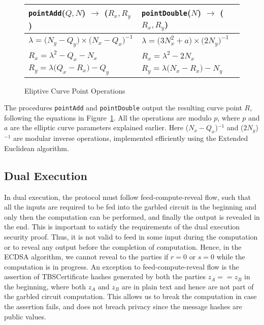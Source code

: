 \begin{figure}[tb]
    \centering
    \begin{tabular}{l|l}
        \texttt{pointAdd}($Q, N$) $\rightarrow$ ($R_x, R_y$) & \texttt{pointDouble}($N$) $\rightarrow$ ($R_x, R_y$) \\ \hline
        $\lambda = \text{(}N_y - Q_y\text{)} \times \text{(}N_x - Q_x\text{)}^{-1}$ & $\lambda = \text{(}3N_x^2 + a\text{)} \times \text{(}2N_y\text{)}^{-1}$ \\
        $R_x = \lambda^2 - Q_x - N_x$ & $R_x = \lambda^2 - 2N_x$ \\
        $R_y = \lambda\text{(}Q_x - R_x\text{)} - Q_y$ & $R_y = \lambda\text{(}N_x - R_x\text{)} - N_y$ \\
    \end{tabular}
    \caption{Eliptive Curve Point Operations}\label{fig:pointops}
\end{figure}

The procedures \texttt{pointAdd} and \texttt{pointDouble} output the resulting curve point $R$, following the equations in Figure~\ref{fig:pointops}. All the operations are modulo $p$, where $p$ and $a$ are the elliptic curve parameters explained earlier. Here ($N_x - Q_x$)$^{-1}$ and ($2N_y$)$^{-1}$ are modular inverse operations, implemented efficiently using the Extended Euclidean algorithm.



\subsection{Dual Execution} 
In dual execution, the protocol must follow feed-compute-reveal flow, such that all the inputs are required to be fed into the garbled circuit in the beginning and only then the computation can be performed, and finally the output is revealed in the end. This is important to satisfy the requirements of the dual execution security proof. Thus, it is not valid to feed in some input during the computation or to reveal any output before the completion of computation. Hence, in the ECDSA algorithm, we cannot reveal to the parties if $r = 0$ or $s = 0$ while the computation is in progress. %
An exception to feed-compute-reveal flow is the assertion of TBSCertificate hashes generated by both the parties $z_A == z_B$ in the beginning, where both $z_A$ and $z_B$ are in plain text and hence are not part of the garbled circuit computation. This allows us to break the computation in case the assertion fails, and does not breach privacy since the message hashes are public values.